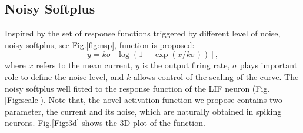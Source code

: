 \documentclass[runningheads,a4paper]{llncs}
\begin{document}
\subsection{Noisy Softplus}
Inspired by the set of response functions triggered by different level of noise, noisy softplus, see Fig.\ref{fig:nsp}, function is proposed:
\begin{equation}
y = k \sigma [\log (1 + \exp(x/k \sigma))],
\label{equ:nsp}
\end{equation}
where $x$ refers to the mean current, $y$ is the output firing rate, $\sigma$ plays important role to define the noise level, and $k$ allows control of the scaling of the curve. 
The noisy softplus well fitted to the response function of the LIF neuron (Fig.\ref{Fig:scale}).
Note that, the novel activation function we propose contains two parameter, the current and its noise, which are naturally obtained in spiking neurons.
Fig.\ref{Fig:3d} shows the 3D plot of the function.
\end{document}
